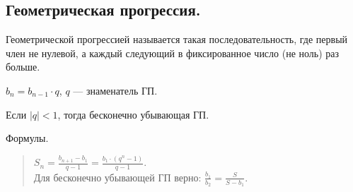 \documentclass{article}
\begin{document}
	\subsection{Геометрическая прогрессия.}
	\begin{definition}
		Геометрической прогрессией называется такая последовательность, где первый член не нулевой, а каждый следующий в фиксированное число (не ноль) раз больше.
	\end{definition}
	\begin{definition}
		$b_n = b_{n - 1} \cdot q$, $q$ --- знаменатель ГП.
	\end{definition}
	\begin{definition}
		Если $|q| < 1$, тогда бесконечно убывающая ГП.
	\end{definition}
	\begin{statement}
		Формулы.
		\begin{quote}
			$S_n = \frac{b_{n + 1} - b_1}{q - 1} = \frac{b_1 \cdot (q^n - 1)}{q - 1}$. \\
			Для бесконечно убывающей ГП верно: $\frac{b_1}{b_2} = \frac{S}{S - b_1}$.
		\end{quote}
	\end{statement}
\end{document}
